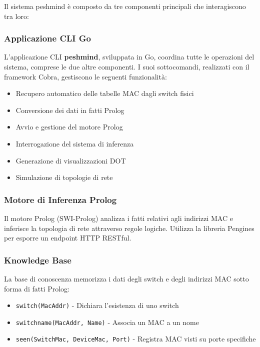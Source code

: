 \documentclass[12pt,a4paper]{article}
\begin{document}
Il sistema peshmind è composto da tre componenti principali che interagiscono tra loro:

\subsubsection{Applicazione CLI Go}

L'applicazione CLI \textbf{peshmind}, sviluppata in Go, coordina tutte le operazioni del sistema, comprese le
due altre componenti. I suoi sottocomandi, realizzati con il framework Cobra, gestiscono le seguenti funzionalità:

\begin{itemize}
    \item Recupero automatico delle tabelle MAC dagli switch fisici
    \item Conversione dei dati in fatti Prolog
    \item Avvio e gestione del motore Prolog
    \item Interrogazione del sistema di inferenza
    \item Generazione di visualizzazioni DOT
    \item Simulazione di topologie di rete
\end{itemize}

\subsubsection{Motore di Inferenza Prolog}

Il motore Prolog (SWI-Prolog) analizza i fatti relativi agli indirizzi MAC e inferisce la topologia di rete attraverso regole logiche. Utilizza la libreria Pengines per esporre un endpoint HTTP RESTful.

\subsubsection{Knowledge Base}

La base di conoscenza memorizza i dati degli switch e degli indirizzi MAC sotto forma di fatti Prolog:

\begin{itemize}
    \item \texttt{switch(MacAddr)} - Dichiara l'esistenza di uno switch
    \item \texttt{switchname(MacAddr, Name)} - Associa un MAC a un nome
    \item \texttt{seen(SwitchMac, DeviceMac, Port)} - Registra MAC visti su porte specifiche
\end{itemize}
\end{document}
